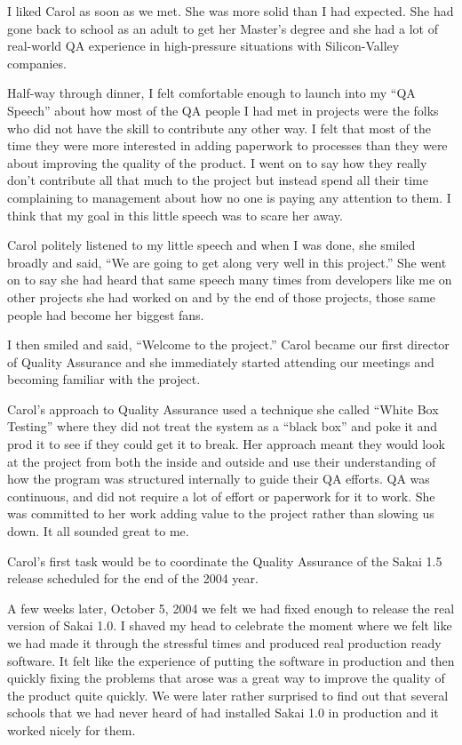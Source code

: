 \documentclass[12pt]{book}
\begin{document}
I liked Carol as soon as we met.  She was more solid
than I had expected.  She had gone back to school
as an adult to get her Master's degree and she had
a lot of real-world QA experience in high-pressure
situations with Silicon-Valley companies.

Half-way through dinner, I felt comfortable enough
to launch into my ``QA Speech'' about how most
of the QA people I had met in projects were the
folks who did not have the skill to contribute
any other way.  I felt that most of the time they
were more interested in adding paperwork to processes
than they were about improving the quality
of the product.  I went on to say how they really
don't contribute all that much to the project
but instead spend all their time complaining
to management about how no one is paying
any attention to them.  I think that my goal
in this little speech was to scare her away.

Carol politely listened to my little speech and when I
was done, she smiled broadly and said, ``We are going to
get along very well in this project.''  She
went on to say she had heard that same speech
many times from developers
like me on other projects she
had worked on and by the end of those projects,
those same people had become her biggest fans.

I then smiled and said, ``Welcome to the
project.'' Carol became our first director
of Quality Assurance and she immediately started
attending our meetings and becoming familiar
with the project.

\begin{sloppypar}
Carol's approach to Quality
Assurance used a technique she called ``White Box
Testing'' where they did not treat the system
as a ``black box'' and poke it and prod it
to see if they could get it to break.  Her
approach meant they would look at the
project from both the inside and outside and
use their understanding of how the program was
structured internally to guide their QA efforts.
QA was continuous, and did not require a lot
of effort or paperwork for it to work.
She was committed to her work adding value to
the project rather than slowing us down.
It all sounded great to me.
\end{sloppypar}

Carol's first task would be to coordinate
the Quality Assurance of the Sakai 1.5 release
scheduled for the end of the 2004 year.

A few weeks later, October 5, 2004 we felt we had fixed
enough to release the real version of Sakai 1.0.
I shaved my head to celebrate the moment where we felt like
we had made it through the stressful times and produced
real production ready software.  It felt like the experience
of putting the software in production and then quickly
fixing the problems that arose was a great way to improve
the quality of the product quite quickly.
We were later rather surprised to find
out that several schools that we had never heard
of had installed Sakai 1.0 in production and
it worked nicely for them.
\end{document}

